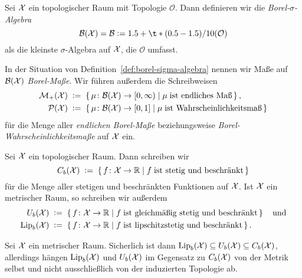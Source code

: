 \documentclass[../thesis/thesis.tex]{subfiles}
\begin{document}
	\begin{Definition}
		\label{def:borel-sigma-algebra}
		Sei $\mathcal{X}$ ein topologischer Raum mit Topologie $\mathcal{O}$. Dann definieren wir die
		\emph{Borel-$\sigma$-Algebra} 
		$$\mathcal{B}(\X) = \mathcal{B} \defby \sigma(\mathcal{O})$$
		als die kleinste $\sigma$-Algebra auf $\mathcal{X}$, die $\mathcal{O}$ umfasst.
	\end{Definition}

	\begin{Definition}
		In der Situation von Definition~\ref{def:borel-sigma-algebra} nennen wir Maße auf $\mathcal{B}(\mathcal{X})$ \emph{Borel-Maße}. Wir führen außerdem die Schreibweisen
		\begin{align*}
			\mathcal{M}_{+}(\mathcal{X})  \; &\vcentcolon = \; \left\{\, \mu \colon \mathcal{B}(\mathcal{X}) \to [0,\infty) \; \middle| \; \mu \; 
				\text{ist endliches Maß} \,\right\} \text{,} \\
			\mathcal{P}(\mathcal{X}) \; &\vcentcolon = \; \left\{\, \mu \colon \mathcal{B}(\mathcal{X}) \to [0,1] \; \middle| \; \mu \; 
				\text{ist Wahrscheinlichkeitsmaß} \,\right\}
		\end{align*}
		für die Menge aller \emph{endlichen Borel-Maße} beziehungsweise \emph{Borel-Wahrscheinlichkeitsmaße} auf $\mathcal{X}$ ein.
	\end{Definition}
	
	\begin{Definition}
		Sei $\mathcal{X}$ ein topologischer Raum. Dann schreiben wir
		\[ C_b(\mathcal{X}) \; \vcentcolon = \; \left\{\, f \colon \mathcal{X} \to \mathbb{R} \; \middle| \; f \; \text{ist stetig und beschränkt} \,\right\} \]
		für die Menge aller stetigen und beschränkten Funktionen auf $\mathcal{X}$. 
		Ist $\mathcal{X}$ ein metrischer Raum, so schreiben wir außerdem
		\begin{align*}
			U_b(\mathcal{X}) \; &\vcentcolon = \; \left\{\, f \colon \mathcal{X} \to \mathbb{R} \; \middle| \; f \; \text{ist gleichmäßig stetig und beschränkt} \,\right\} \quad \text{und} \\
			\mathrm{Lip}_b(\mathcal{X}) \; &\vcentcolon = \; \left\{\, f \colon \mathcal{X} \to \mathbb{R} \; \middle| \; f \; \text{ist lipschitzstetig und beschränkt} \,\right\} \text{.}
		\end{align*}
	\end{Definition}
	
	\begin{Bemerkung}
		Sei $\mathcal{X}$ ein metrischer Raum. Sicherlich ist dann $\mathrm{Lip}_b(\mathcal{X}) \subseteq U_b(\mathcal{X}) \subseteq C_b(\mathcal{X})$, allerdings hängen $\mathrm{Lip}_b(\mathcal{X})$ und $U_b(\mathcal{X})$ im Gegensatz 
		zu $C_b(\mathcal{X})$ von der Metrik selbst und nicht ausschließlich von der induzierten Topologie ab.
	\end{Bemerkung}
	
\end{document}
